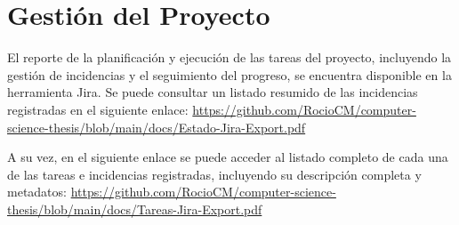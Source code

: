 \section{Gestión del Proyecto}

El reporte de la planificación y ejecución de las tareas del proyecto, incluyendo la gestión de incidencias y el seguimiento del progreso, se encuentra disponible en la herramienta Jira. Se puede consultar un listado resumido de las incidencias registradas en el siguiente enlace: \href{https://github.com/RocioCM/computer-science-thesis/blob/main/docs/Estado-Jira-Export.pdf}{https://github.com/RocioCM/computer-science-thesis/blob/main/docs/Estado-Jira-Export.pdf}

A su vez, en el siguiente enlace se puede acceder al listado completo de cada una de las tareas e incidencias registradas, incluyendo su descripción completa y metadatos: \href{https://github.com/RocioCM/computer-science-thesis/blob/main/docs/Tareas-Jira-Export.pdf}{https://github.com/RocioCM/computer-science-thesis/blob/main/docs/Tareas-Jira-Export.pdf}


